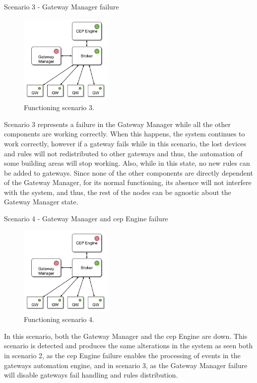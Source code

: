 \begin{Paragraph}{Scenario 3 - Gateway Manager failure}
	\begin{figure}[H]
		\centering
		\includegraphics[width=0.4\textwidth]{figures/fs5.png}
		\caption{Functioning scenario 3.}
		\label{fig:fs5}
	\end{figure}

Scenario 3 represents a failure in the Gateway Manager while all the other components are working correctly. When this happens, the system continues to work correctly, however if a gateway fails while in this scenario, the lost devices and rules will not redistributed to other gateways and thus, the automation of some building areas will stop working. Also, while in this state, no new rules can be added to gateways. Since none of the other components are directly dependent of the Gateway Manager, for its normal functioning, its absence will not interfere with the system, and thus, the rest of the nodes can be agnostic about the Gateway Manager state.


\end{Paragraph}



\begin{Paragraph}{Scenario 4 - Gateway Manager and \ac{cep} Engine failure}
\begin{figure}[H]
	\centering
	\includegraphics[width=0.4\textwidth]{figures/fs4.png}
	\caption{Functioning scenario 4.}
	\label{fig:fs4}
\end{figure}

In this scenario, both the Gateway Manager and the \ac{cep} Engine are down. This scenario is detected and produces the same alterations in the system as seen both in scenario 2, as the \ac{cep} Engine failure enables the processing of events in the gateways automation engine, and in scenario 3, as the Gateway Manager failure will disable gateways fail handling and rules distribution.



\end{Paragraph}


